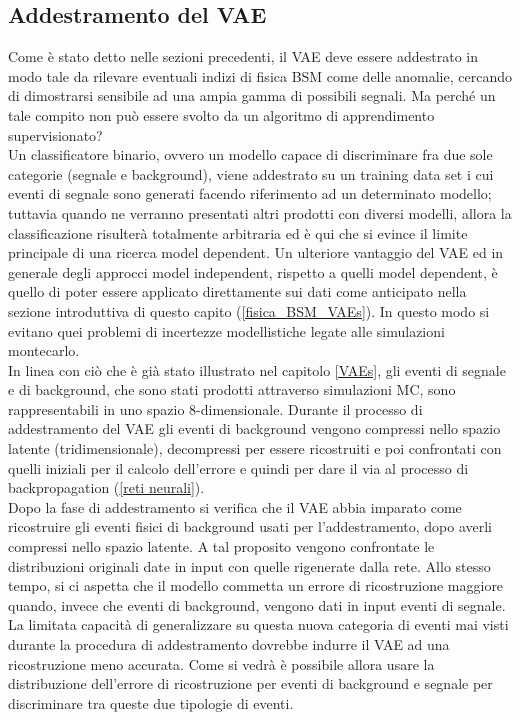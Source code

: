 \subsection{Addestramento del VAE}
\label{simulazione}
Come è stato detto nelle sezioni precedenti, il VAE deve essere addestrato in modo tale da rilevare eventuali indizi di fisica BSM come delle anomalie, cercando di dimostrarsi sensibile ad una ampia gamma di possibili segnali. Ma perché un tale compito non può essere svolto da un algoritmo di apprendimento supervisionato?\\
Un classificatore binario, ovvero un modello capace di discriminare fra due sole categorie (segnale e background), viene addestrato su un training data set i cui eventi di segnale sono generati facendo riferimento ad un determinato modello; tuttavia quando ne verranno presentati altri prodotti con diversi modelli, allora la classificazione risulterà totalmente arbitraria ed è qui che si evince il limite principale di una ricerca model dependent. Un ulteriore vantaggio del VAE ed in generale degli approcci model independent, rispetto a quelli model dependent, è quello di poter essere applicato direttamente sui dati come anticipato nella sezione introduttiva di questo capito (\ref{fisica_BSM_VAEs}). In questo modo si evitano quei problemi di incertezze modellistiche legate alle simulazioni montecarlo.\\
In linea con ciò che è già stato illustrato nel capitolo \ref{VAEs}, gli eventi di segnale e di background, che sono stati prodotti attraverso simulazioni MC, sono rappresentabili in uno spazio 8-dimensionale. Durante il processo di addestramento del VAE gli eventi di background vengono compressi nello spazio latente (tridimensionale), decompressi per essere ricostruiti e poi confrontati con quelli iniziali per il calcolo dell'errore e quindi per dare il via al processo di backpropagation (\ref{reti neurali}). \\
Dopo la fase di addestramento si verifica che il VAE abbia imparato come ricostruire gli eventi fisici di background usati per l'addestramento, dopo averli compressi nello spazio latente. A tal proposito vengono confrontate le distribuzioni originali date in input con quelle rigenerate dalla rete. Allo stesso tempo, si ci aspetta che il modello  commetta un errore di ricostruzione maggiore quando, invece che eventi di background, vengono dati in input eventi di segnale. La limitata capacità di generalizzare su questa nuova categoria di eventi mai visti durante la procedura di addestramento dovrebbe indurre il VAE ad una ricostruzione meno accurata. Come si vedrà è possibile allora usare la distribuzione dell'errore di ricostruzione per eventi di background e segnale per discriminare tra queste due tipologie di eventi.\\
